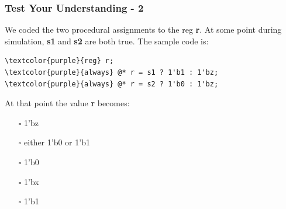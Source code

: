 \documentclass[t, notes, xcolor=table]{beamer}
\begin{document}
\begin{frame}[fragile]
\frametitle{Test Your Understanding - 2}
We coded the two procedural assignments to the reg \textbf{r}. At some point during simulation, \textbf{s1} and \textbf{s2} are both true. The sample code is:
\begin{Verbatim}[commandchars=\\\{\}, tabsize=2]
\textcolor{purple}{reg} r;
\textcolor{purple}{always} @* r = s1 ? 1'b1 : 1'bz;
\textcolor{purple}{always} @* r = s2 ? 1'b0 : 1'bz;
\end{Verbatim}
At that point the value \textbf{r} becomes:
\begin{itemize}
\item[$\square$] 1'bz
\item[$\square$] either 1'b0 or 1'b1
\item[$\square$] 1'b0
\item[$\square$] 1'bx
\item[$\square$] 1'b1
\end{itemize}
\end{frame}
\end{document}
